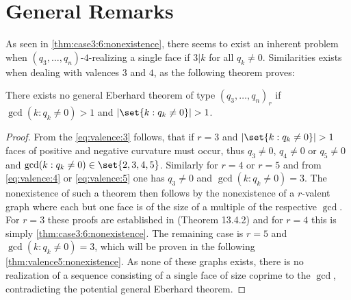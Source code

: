 \section{General Remarks}

As seen in \autoref{thm:case3:6:nonexistence}, there seems to exist an inherent problem when $(q_3, \dots, q_n)$-$4$-realizing a single face if $3 | k$ for all $q_k \neq 0$. Similarities exists when dealing with valences $3$ and $4$, as the following theorem proves:

\begin{theorem}
  There exists no general Eberhard theorem of type $(q_3, \dots, q_n)_r$ if $\gcd (k : q_k \neq 0) > 1$ and $|\set{k : q_k \neq 0}|>1$.
  \begin{proof}
    From the \autoref{eq:valence:3} follows, that if $r=3$ and $|\set{k : q_k \neq 0}|>1$ faces of positive and negative curvature must occur, thus $q_3 \neq 0$, $q_4 \neq 0$ or $q_5 \neq 0$ and $\gcd (k : q_k \neq 0) \in \set{2, 3, 4, 5}$. Similarly for $r=4$ or $r=5$ and from \autoref{eq:valence:4} or \autoref{eq:valence:5} one has $q_3 \neq 0$ and $\gcd (k : q_k \neq 0) = 3$. The nonexistence of such a theorem then follows by the nonexistence of a $r$-valent graph where each but one face is of the size of a multiple of the respective $\gcd$. For $r = 3$ these proofs are established in \cite{ConvexPolytopes} (Theorem 13.4.2) and for $r=4$ this is simply \autoref{thm:case3:6:nonexistence}. The remaining case is $r=5$ and $\gcd (k : q_k \neq 0) = 3$, which will be proven in the following \autoref{thm:valence5:nonexistence}. As none of these graphs exists, there is no realization of a sequence consisting of a single face of size coprime to the $\gcd$, contradicting the potential general Eberhard theorem.
  \end{proof}
\end{theorem}

